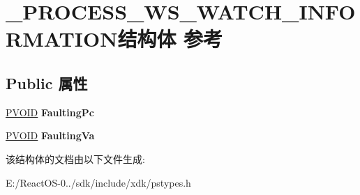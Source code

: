 \hypertarget{struct___p_r_o_c_e_s_s___w_s___w_a_t_c_h___i_n_f_o_r_m_a_t_i_o_n}{}\section{\+\_\+\+P\+R\+O\+C\+E\+S\+S\+\_\+\+W\+S\+\_\+\+W\+A\+T\+C\+H\+\_\+\+I\+N\+F\+O\+R\+M\+A\+T\+I\+O\+N结构体 参考}
\label{struct___p_r_o_c_e_s_s___w_s___w_a_t_c_h___i_n_f_o_r_m_a_t_i_o_n}
\subsection*{Public 属性}
\begin{DoxyCompactItemize}
\item 
\mbox{\label{struct___p_r_o_c_e_s_s___w_s___w_a_t_c_h___i_n_f_o_r_m_a_t_i_o_n_aaa539b1abf05e0cdb02b74e0e71fb2d5}} 
\hyperlink{interfacevoid}{P\+V\+O\+ID} {\bfseries Faulting\+Pc}
\item 
\mbox{\label{struct___p_r_o_c_e_s_s___w_s___w_a_t_c_h___i_n_f_o_r_m_a_t_i_o_n_a15ee385fa4ed0e3ad4d6e346399ba403}} 
\hyperlink{interfacevoid}{P\+V\+O\+ID} {\bfseries Faulting\+Va}
\end{DoxyCompactItemize}


该结构体的文档由以下文件生成\+:\begin{DoxyCompactItemize}
\item 
E\+:/\+React\+O\+S-\/0../sdk/include/xdk/pstypes.\+h\end{DoxyCompactItemize}
